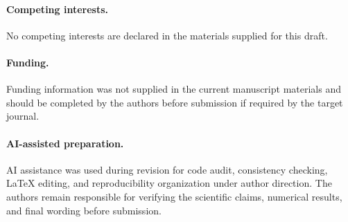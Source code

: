\documentclass[11pt,a4paper]{article}
\theoremstyle{definition}
\numberwithin{equation}{section}   %
\begin{document}
\paragraph{Competing interests.}
No competing interests are declared in the materials supplied for this draft.

\paragraph{Funding.}
Funding information was not supplied in the current manuscript materials and
should be completed by the authors before submission if required by the target
journal.

\paragraph{AI-assisted preparation.}
AI assistance was used during revision for code audit, consistency checking,
LaTeX editing, and reproducibility organization under author direction. The
authors remain responsible for verifying the scientific claims, numerical
results, and final wording before submission.



\end{document}
